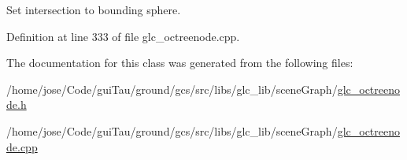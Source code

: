 Set intersection to bounding sphere. 



Definition at line 333 of file glc\-\_\-octreenode.\-cpp.



The documentation for this class was generated from the following files\-:\begin{DoxyCompactItemize}
\item 
/home/jose/\-Code/gui\-Tau/ground/gcs/src/libs/glc\-\_\-lib/scene\-Graph/\hyperlink{glc__octreenode_8h}{glc\-\_\-octreenode.\-h}\item 
/home/jose/\-Code/gui\-Tau/ground/gcs/src/libs/glc\-\_\-lib/scene\-Graph/\hyperlink{glc__octreenode_8cpp}{glc\-\_\-octreenode.\-cpp}\end{DoxyCompactItemize}
